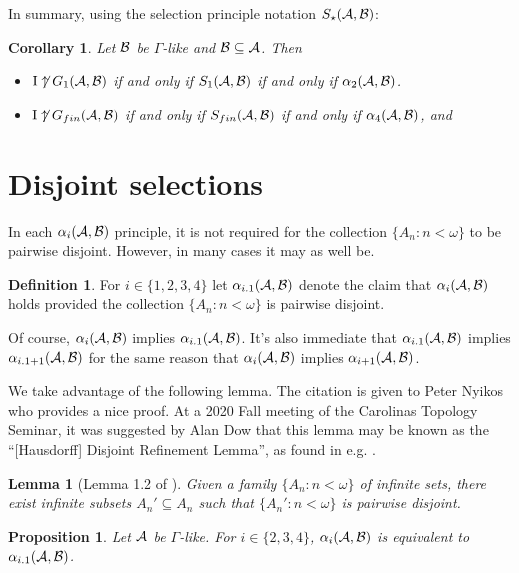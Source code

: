 \documentclass{amsart}
\theoremstyle{plain}
\newtheorem{lemma}[theorem]{Lemma}
\newtheorem{corollary}[theorem]{Corollary}
\newtheorem{proposition}[theorem]{Proposition}
\theoremstyle{definition}
\newtheorem{definition}[theorem]{Definition}
\theoremstyle{remark}
\theoremstyle{plain}
\theoremstyle{definition}
\theoremstyle{remark}
\begin{document}
In summary, using the selection principle notation \(S_\star(\mathcal{A},\mathcal{B})\):

\begin{corollary}
Let \(\mathcal{B}\) be \(\Gamma\)-like and \(\mathcal{B}\subseteq\mathcal{A}\).
Then 
\begin{itemize}
\item \(\mathrm{I}\not\uparrow G_{1}(\mathcal{A},\mathcal{B})\) if and only if
\(S_{1}(\mathcal{A},\mathcal{B})\) if and only if
\(\alpha_2(\mathcal{A},\mathcal{B})\).
\item \(\mathrm{I}\not\uparrow G_{fin}(\mathcal{A},\mathcal{B})\) if and only if
\(S_{fin}(\mathcal{A},\mathcal{B})\) if and only if
\(\alpha_4(\mathcal{A},\mathcal{B})\), and
\end{itemize}
\end{corollary}

\section{Disjoint selections}

In each \(\alpha_i(\mathcal{A},\mathcal{B})\) principle, it is not required for the collection
\(\{A_n:n<\omega\}\) to be pairwise disjoint. However, in many cases it may as
well be.

\begin{definition}
For \(i\in\{1,2,3,4\}\) let \(\alpha_{i.1}(\mathcal{A},\mathcal{B})\) denote the claim that
\(\alpha_i(\mathcal{A},\mathcal{B})\) holds provided the collection \(\{A_n:n<\omega\}\)
is pairwise disjoint.
\end{definition}

Of course, \(\alpha_i(\mathcal{A},\mathcal{B})\) implies \(\alpha_{i.1}(\mathcal{A},\mathcal{B})\).
It's also immediate that \(\alpha_{i.1}(\mathcal{A},\mathcal{B})\) implies
\(\alpha_{i.1+1}(\mathcal{A},\mathcal{B})\) for the same reason that \(\alpha_i(\mathcal{A},\mathcal{B})\)
implies \(\alpha_{i+1}(\mathcal{A},\mathcal{B})\). 

We take advantage of the following lemma. The citation is given to Peter Nyikos who provides
a nice proof. At a 2020 Fall meeting of the Carolinas Topology Seminar,
it was suggested by Alan Dow that this lemma may be known as the
``[Hausdorff] Disjoint Refinement Lemma'', as found in e.g. \cite[Lemma 3.4]{COMFORT1996149}.

\begin{lemma}[Lemma 1.2 of \cite{MR1195504}]
Given a family \(\{A_n:n<\omega\}\) of infinite sets, there exist infinite subsets
\(A_n'\subseteq A_n\) such that \(\{A_n':n<\omega\}\) is pairwise disjoint.
\end{lemma}

\begin{proposition}\label{pointOne}
Let \(\mathcal{A}\) be \(\Gamma\)-like.
For \(i\in\{2,3,4\}\), \(\alpha_i(\mathcal{A},\mathcal{B})\) is equivalent to
\(\alpha_{i.1}(\mathcal{A},\mathcal{B})\).
\end{proposition}
\end{document}
